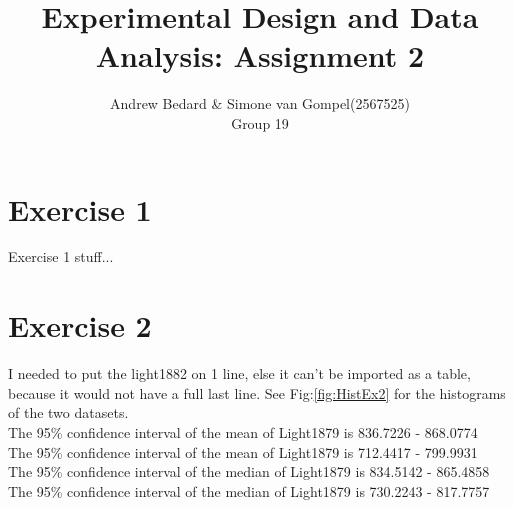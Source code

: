 \documentclass{article}
\title{Experimental Design and Data Analysis: Assignment 2}
\author{Andrew Bedard \& Simone van Gompel(2567525) \\ Group 19}
\begin{document}
  \maketitle

  \section{Exercise 1}
    Exercise 1 stuff...

  \section{Exercise 2}
    I needed to put the light1882 on 1 line, else it can't be imported as a table,
    because it would not have a full last line.
    See Fig:\ref{fig:HistEx2} for the histograms of the two datasets.\\
    The 95\% confidence interval of the mean of Light1879 is 836.7226 - 868.0774\\
    The 95\% confidence interval of the mean of Light1879 is 712.4417 - 799.9931\\
    The 95\% confidence interval of the median of Light1879 is 834.5142 - 865.4858\\
    The 95\% confidence interval of the median of Light1879 is 730.2243 - 817.7757\\
\end{document}
